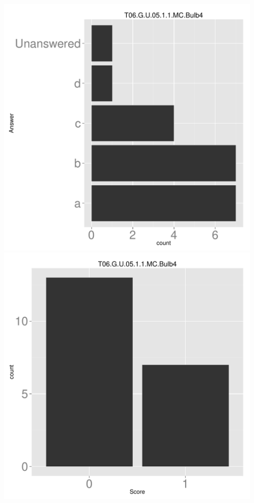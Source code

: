 \documentclass[12pt,nohyper]{tufte-handout}\usepackage[]{graphicx}\usepackage[]{color}
\begin{document}
\begin{center} \includegraphics[width=.45\linewidth]{Topic06_86_answer} \includegraphics[width=.45\linewidth]{Topic06_86_score} \end{center} 
\end{document}
